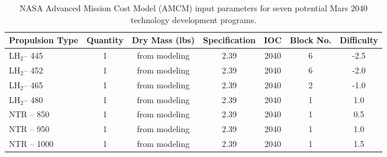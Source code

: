 \documentclass[]{aiaa-pretty}
\begin{document}
\begin{table}[b]
\centering
\caption{NASA Advanced Mission Cost Model (AMCM) input parameters for seven potential Mars 2040 technology development programs.}
\label{tab:AMCM}
\begin{tabular}{lcccccc}
\textbf{Propulsion Type} & \multicolumn{1}{l}{\textbf{Quantity}} & \multicolumn{1}{l}{\textbf{Dry Mass (lbs)}} & \multicolumn{1}{l}{\textbf{Specification}} & \multicolumn{1}{l}{\textbf{IOC}} & \multicolumn{1}{l}{\textbf{Block No.}} & \multicolumn{1}{l}{\textbf{Difficulty}} \\\hline
 LH$_2$– 445                         & 1                                     & from modeling                               & 2.39                                       & 2040                                                      & 6                                      & -2.5                                    \\
 LH$_2$– 452                         & 1                                     & from modeling                               & 2.39                                       & 2040                                                      & 6                                      & -2.0                                    \\
 LH$_2$– 465                         & 1                                     & from modeling                               & 2.39                                       & 2040                                                      & 2                                      & -1.0                                    \\
 LH$_2$– 480                         & 1                                     & from modeling                               & 2.39                                       & 2040                                                      & 1                                      & 1.0                                     \\
NTR – 850                        & 1                                     & from modeling                               & 2.39                                       & 2040                                                      & 1                                      & 0.5                                     \\
NTR – 950                        & 1                                     & from modeling                               & 2.39                                       & 2040                                                      & 1                                      & 1.0                                     \\
NTR – 1000                       & 1                                     & from modeling                               & 2.39                                       & 2040                                                      & 1                                      & 1.5                                    
\end{tabular}
\end{table}
\end{document}
